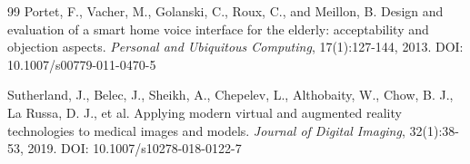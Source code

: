 \documentclass[12pt,a4paper]{article}
\begin{document}
\begin{thebibliography}{99}
Portet, F., Vacher, M., Golanski, C., Roux, C., and Meillon, B. Design and evaluation of a smart home voice interface for the elderly: acceptability and objection aspects. \textit{Personal and Ubiquitous Computing}, 17(1):127-144, 2013. DOI: 10.1007/s00779-011-0470-5

Sutherland, J., Belec, J., Sheikh, A., Chepelev, L., Althobaity, W., Chow, B. J., La Russa, D. J., et al. Applying modern virtual and augmented reality technologies to medical images and models. \textit{Journal of Digital Imaging}, 32(1):38-53, 2019. DOI: 10.1007/s10278-018-0122-7


\end{thebibliography}
\end{document}
